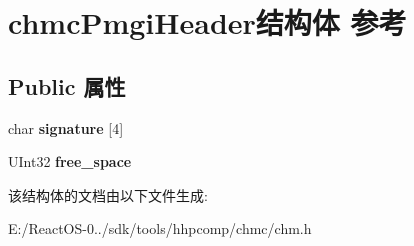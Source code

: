 \hypertarget{structchmc_pmgi_header}{}\section{chmc\+Pmgi\+Header结构体 参考}
\label{structchmc_pmgi_header}
\subsection*{Public 属性}
\begin{DoxyCompactItemize}
\item 
\mbox{\label{structchmc_pmgi_header_a28c500a1ec72fafbd3d38f90b7a7e7f1}} 
char {\bfseries signature} \mbox{[}4\mbox{]}
\item 
\mbox{\label{structchmc_pmgi_header_a7ec99b4ce012bc9ed1744302bbb9d94d}} 
U\+Int32 {\bfseries free\+\_\+space}
\end{DoxyCompactItemize}


该结构体的文档由以下文件生成\+:\begin{DoxyCompactItemize}
\item 
E\+:/\+React\+O\+S-\/0../sdk/tools/hhpcomp/chmc/chm.\+h\end{DoxyCompactItemize}
